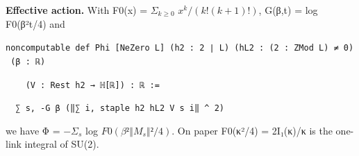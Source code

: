 \documentclass[11pt,a4paper]{article}
\theoremstyle{named}
\begin{document}
\textbf{Effective action.} With F0(x) = $Σ_{k≥0}$ $x^k/(k!(k+1)!)$, G(β,t) = log F0(β²t/4) and

\begin{leancode}
\item \texttt{noncomputable\ \allowbreak{}def\ \allowbreak{}Phi\ \allowbreak{}[NeZero\ \allowbreak{}L]\ \allowbreak{}(h2\ \allowbreak{}:\ \allowbreak{}2\ \allowbreak{}∣\ \allowbreak{}L)\ \allowbreak{}(hL2\ \allowbreak{}:\ \allowbreak{}(2\ \allowbreak{}:\ \allowbreak{}ZMod\ \allowbreak{}L)\ \allowbreak{}≠\ \allowbreak{}0)\ \allowbreak{}(β\ \allowbreak{}:\ \allowbreak{}ℝ)}
\item \texttt{\ \allowbreak{}\ \allowbreak{}\ \allowbreak{}\ \allowbreak{}(V\ \allowbreak{}:\ \allowbreak{}Rest\ \allowbreak{}h2\ \allowbreak{}→\ \allowbreak{}ℍ[ℝ])\ \allowbreak{}:\ \allowbreak{}ℝ\ \allowbreak{}:=}
\item \texttt{\ \allowbreak{}\ \allowbreak{}∑\ \allowbreak{}s,\ \allowbreak{}-G\ \allowbreak{}β\ \allowbreak{}(‖∑\ \allowbreak{}i,\ \allowbreak{}staple\ \allowbreak{}h2\ \allowbreak{}hL2\ \allowbreak{}V\ \allowbreak{}s\ \allowbreak{}i‖\ \allowbreak{}\textasciicircum{}\ \allowbreak{}2)}
\end{leancode}
we have Φ = $−Σ_s$ log $F0(β²‖M_s‖²/4)$. On paper F0(κ²/4) = 2I₁(κ)/κ is the one-link integral of SU(2).
\end{document}
